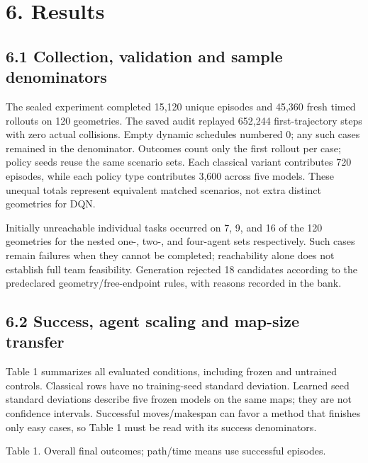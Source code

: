 \documentclass[10pt,a4paper]{article}
\begin{document}
\section*{6. Results}



\subsection*{6.1 Collection, validation and sample denominators}



The sealed experiment completed 15,120 unique episodes and 45,360 fresh timed rollouts on 120 geometries. The saved audit replayed 652,244 first-trajectory steps with zero actual collisions. Empty dynamic schedules numbered 0; any such cases remained in the denominator. Outcomes count only the first rollout per case; policy seeds reuse the same scenario sets. Each classical variant contributes 720 episodes, while each policy type contributes 3,600 across five models. These unequal totals represent equivalent matched scenarios, not extra distinct geometries for DQN.



Initially unreachable individual tasks occurred on 7, 9, and 16 of the 120 geometries for the nested one-, two-, and four-agent sets respectively. Such cases remain failures when they cannot be completed; reachability alone does not establish full team feasibility. Generation rejected 18 candidates according to the predeclared geometry/free-endpoint rules, with reasons recorded in the bank.



\subsection*{6.2 Success, agent scaling and map-size transfer}



Table 1 summarizes all evaluated conditions, including frozen and untrained controls. Classical rows have no training-seed standard deviation. Learned seed standard deviations describe five frozen models on the same maps; they are not confidence intervals. Successful moves/makespan can favor a method that finishes only easy cases, so Table 1 must be read with its success denominators.



Table 1. Overall final outcomes; path/time means use successful episodes.
\end{document}
